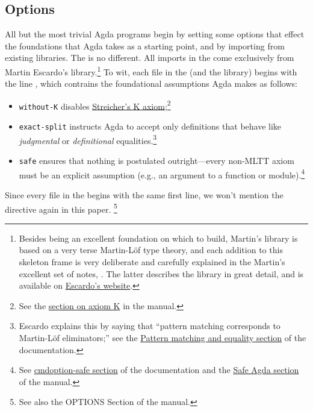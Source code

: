 \documentclass[a4paper,USenglish,cleveref,autoref,thm-restate]{lipics-v2019}
\begin{document}
\subsection{Options}\label{sec:options}
All but the most trivial Agda programs begin by setting some options that effect the foundations that Agda takes as a starting point, and by importing from existing libraries. The \agdaualib is no different. All imports in the \agdaualib come exclusively from Martin Escardo's \typetopology library.\footnote{Besides being an excellent foundation on which to build, Martin's library is based on a very terse Martin-L\"of type theory, and each addition to this skeleton frame is very deliberate and carefully explained in the Martin's excellent set of notes, \hottufinagda.  The latter describes the \typetopology library in great detail, and is available on \href{https://www.cs.bham.ac.uk/~mhe/HoTT-UF-in-Agda-Lecture-Notes}{Escardo's website}.} To wit, each file in the \agdaualib (and the \typetopology library) begins with the line \AgdaSymbol{\{-\#}\AgdaSpace{}\AgdaSpace{}\AgdaSpace{}\AgdaSpace{}\AgdaSpace{}\AgdaSymbol{\#-\}}, 
which contrains the foundational assumptions Agda makes as follows:
\begin{itemize}
\item \texttt{without-K} disables \href{https://ncatlab.org/nlab/show/axiom+K+\%28type+theory\%29}{Streicher's K axiom};\footnote{See the \href{https://agda.readthedocs.io/en/v2.6.1/language/without-k.html}{section on axiom K} in the \agdalangref manual.}
\item \texttt{exact-split} instructs Agda to accept only definitions that behave like \emph{judgmental} or \emph{definitional} equalities.\footnote{Escardo explains this by saying that ``pattern matching corresponds to Martin-Löf eliminators;'' see the \href{https://agda.readthedocs.io/en/v2.6.1/tools/command-line-options.html\#pattern-matching-and-equality}{Pattern matching and equality section} of the \agdatools documentation.}
\item \texttt{safe} ensures that nothing is postulated outright---every non-MLTT axiom must be an explicit assumption (e.g., an argument to a function or module).\footnote{See \href{https://agda.readthedocs.io/en/v2.6.1/tools/command-line-options.html\#cmdoption-safe}{cmdoption-safe section} of the \agdatools documentation and the \href{https://agda.readthedocs.io/en/v2.6.1/language/safe-agda.html\#safe-agda}{Safe Agda section} of the \agdalangref manual.}
\end{itemize}
Since every file in the \agdaualib begins with the same first line, we won't mention the  directive again in this paper.%
\footnote{See also the OPTIONS Section of the \agdalangref manual.}
\end{document}

